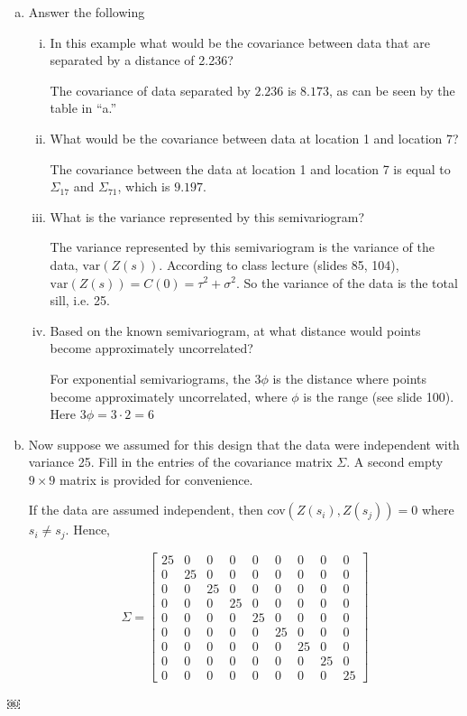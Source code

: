 \documentclass[letterpaper, 12pt]{article}\usepackage[]{graphicx}\usepackage[]{color}
\newcommand{\var}{\text{var}}
\begin{document}
\begin{enumerate}[a.]
\item
Answer the following
\begin{enumerate}[(i)]
\item
In this example what would be the covariance between data that are separated by a distance of 2.236?

\textsf{The covariance of data separated by $2.236$ is $8.173$, as can be seen by the table in ``a.''}
\item
What would be the covariance between data at location 1 and location 7?

\textsf{The covariance between the data at location 1 and location 7 is equal to $\Sigma_{17}$ and $\Sigma_{71}$, which is $9.197$.}
\item
What is the variance represented by this semivariogram?

\textsf{The variance represented by this semivariogram is the variance of the data, $\var(Z(s))$. According to class lecture (slides 85, 104), $\var(Z(s)) = C(0) = \tau^2 + \sigma^2$. So the variance of the data is the total sill, i.e. 25.}
\item
Based on the known semivariogram, at what distance would points become approximately uncorrelated?

\textsf{For exponential semivariograms, the $3\phi$ is the distance where points become approximately uncorrelated, where $\phi$ is the range (see slide 100). Here $3\phi = 3\cdot 2= 6
$}
\end{enumerate}
\item
Now suppose we assumed for this design that the data were independent with variance 25. Fill in the entries of the covariance matrix $\Sigma$. A second empty $9 \times 9$ matrix is provided for convenience.

{\sf
If the data are assumed independent, then cov$(Z(s_i),Z(s_j)) = 0$ where $s_i \neq s_j$. Hence,
}


\[
\Sigma = \begin{bmatrix}
 25 & 0 & 0 & 0 & 0 & 0 & 0 & 0 & 0 \\
 0 & 25 & 0 & 0 & 0 & 0 & 0 & 0 & 0 \\
 0 & 0 & 25 & 0 & 0 & 0 & 0 & 0 & 0 \\
 0 & 0 & 0 & 25 & 0 & 0 & 0 & 0 & 0 \\
 0 & 0 & 0 & 0 & 25 & 0 & 0 & 0 & 0 \\
 0 & 0 & 0 & 0 & 0 & 25 & 0 & 0 & 0 \\
 0 & 0 & 0 & 0 & 0 & 0 & 25 & 0 & 0 \\
 0 & 0 & 0 & 0 & 0 & 0 & 0 & 25 & 0 \\
 0 & 0 & 0 & 0 & 0 & 0 & 0 & 0 & 25\end{bmatrix}\]

\end{enumerate}
￼
\end{document}
